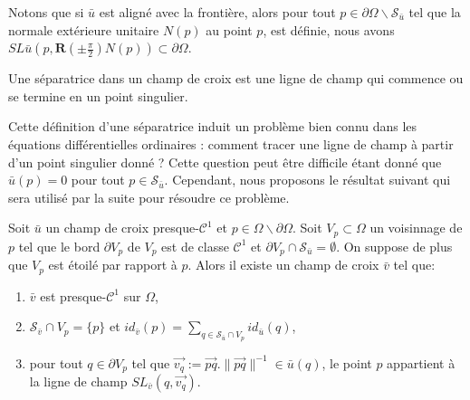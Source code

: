 \begin{remark}
Notons que si $\bar{u}$ est aligné avec la frontière, alors pour tout $p\in \partial \Omega \backslash \mathcal{S}_{\bar{u}}$ tel que la normale extérieure unitaire $N(p)$ au point $p$, est définie, nous avons $SL{\bar{u}}\left(p,\mathbf{R}\left(\pm \frac{\pi}{2}\right)N(p)\right) \subset \partial \Omega$.
\end{remark}

\begin{definition}[Séparatrice] \label{def:sep}
Une séparatrice dans un champ de croix est une ligne de champ qui commence ou se termine en un point singulier.
\end{definition}

Cette définition d'une séparatrice induit un problème bien connu dans les équations différentielles ordinaires : comment tracer une ligne de champ à partir d'un point singulier donné ? Cette question peut être difficile étant donné que $\bar{u}(p)={0}$ pour tout $p\in \mathcal{S}_{\bar{u}}$. Cependant, nous proposons le résultat suivant qui sera utilisé par la suite pour résoudre ce problème.
\begin{proposition}
\label{prop:stream_from_interior_sing}
Soit $\bar{u}$ un champ de croix presque-$\mathcal{C}^1$ et $p\in \Omega\backslash\partial\Omega$. Soit $V_p\subset\Omega$ un voisinnage de $p$ tel que le bord $\partial V_p$ de $V_p$ est de classe $\mathcal{C}^1$ et $\partial V_p\cap\mathcal{S}_{\bar{u}}=\emptyset$. On suppose de plus que $V_p$ est étoilé par rapport à $p$. Alors il existe un champ de croix $\bar{v}$ tel que:\\[-0.3cm]
\begin{enumerate}
\item $\bar{v}$ est presque-$\mathcal{C}^1$ sur $\Omega$,\\[-0.3cm]
\item $\mathcal{S}_{\bar{v}}\cap V_p =\{p\}$ et $id_{\bar{v}}(p)=\sum_{q\in \mathcal{S}_{\bar{u}}\cap V_p} id_{\bar{u}}(q)$,\\[-0.3cm]
\item pour tout $q\in \partial V_p$ tel que $\overrightarrow{v_q}:=\overrightarrow{pq}.\|\overrightarrow{pq}\|^{-1}\in \bar{u}(q)$, le point $p$ appartient à la ligne de champ $SL_{\bar{v}}(q,\overrightarrow{v_q})$.\\[-0.3cm]
\end{enumerate}
\end{proposition}

